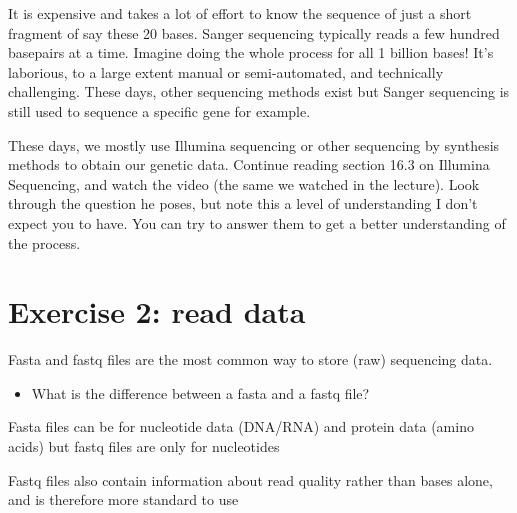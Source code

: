 \documentclass[
  letterpaper,
  DIV=11,
  numbers=noendperiod]{scrreprt}
\providecommand{\tightlist}{%
  \setlength{\itemsep}{0pt}\setlength{\parskip}{0pt}}\usepackage{longtable,booktabs,array}
\begin{document}
\begin{tcolorbox}[enhanced jigsaw, arc=.35mm, left=2mm, titlerule=0mm, rightrule=.15mm, colframe=quarto-callout-tip-color-frame, coltitle=black, colback=white, opacityback=0, bottomtitle=1mm, bottomrule=.15mm, colbacktitle=quarto-callout-tip-color!10!white, breakable, title=\textcolor{quarto-callout-tip-color}{\faLightbulb}\hspace{0.5em}{Answer}, toptitle=1mm, toprule=.15mm, opacitybacktitle=0.6, leftrule=.75mm]

It is expensive and takes a lot of effort to know the sequence of just a
short fragment of say these 20 bases. Sanger sequencing typically reads
a few hundred basepairs at a time. Imagine doing the whole process for
all 1 billion bases! It's laborious, to a large extent manual or
semi-automated, and technically challenging. These days, other
sequencing methods exist but Sanger sequencing is still used to sequence
a specific gene for example.

\end{tcolorbox}

These days, we mostly use Illumina sequencing or other sequencing by
synthesis methods to obtain our genetic data. Continue reading section
16.3 on Illumina Sequencing, and watch the video (the same we watched in
the lecture). Look through the question he poses, but note this a level
of understanding I don't expect you to have. You can try to answer them
to get a better understanding of the process.

\section{Exercise 2: read data}\label{exercise-2-read-data}

Fasta and fastq files are the most common way to store (raw) sequencing
data.

\begin{itemize}
\tightlist
\item
  What is the difference between a fasta and a fastq file?
\end{itemize}

\begin{tcolorbox}[enhanced jigsaw, arc=.35mm, left=2mm, titlerule=0mm, rightrule=.15mm, colframe=quarto-callout-tip-color-frame, coltitle=black, colback=white, opacityback=0, bottomtitle=1mm, bottomrule=.15mm, colbacktitle=quarto-callout-tip-color!10!white, breakable, title=\textcolor{quarto-callout-tip-color}{\faLightbulb}\hspace{0.5em}{Answer}, toptitle=1mm, toprule=.15mm, opacitybacktitle=0.6, leftrule=.75mm]

Fasta files can be for nucleotide data (DNA/RNA) and protein data (amino
acids) but fastq files are only for nucleotides

Fastq files also contain information about read quality rather than
bases alone, and is therefore more standard to use

\end{tcolorbox}
\end{document}
